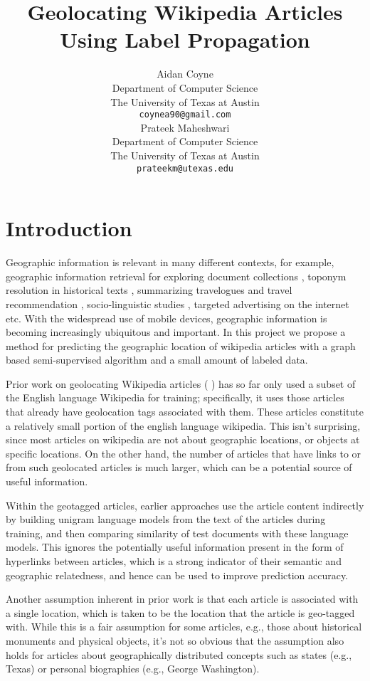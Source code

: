 \documentclass[11pt]{article}
\title{Geolocating Wikipedia Articles Using Label Propagation}
\author{
  Aidan Coyne \\
    Department of Computer Science\\
    The University of Texas at Austin\\
  {\tt coynea90@gmail.com} \\ 
  \And
  Prateek Maheshwari\\
    Department of Computer Science\\
    The University of Texas at Austin\\
  {\tt prateekm@utexas.edu}
}
\date{}
\newcommand{\comment}[1]{}
\begin{document}
\maketitle



\section{Introduction}
\comment{You can now enclose text in a comment block to comment it out inline}
Geographic information is relevant in many different contexts, for example, geographic information retrieval for exploring document collections \cite{}, 
toponym resolution in historical texts \cite{perseus project},  summarizing travelogues and travel recommendation \cite{hao},
socio-linguistic studies \cite{eisenstien}, targeted advertising on the internet etc. With the widespread use of mobile devices, geographic information is becoming increasingly 
ubiquitous and important. In this project we propose a method for predicting the geographic location of wikipedia articles 
with a graph based semi-supervised algorithm and a small amount of labeled data.

Prior work on geolocating Wikipedia articles (\cite{wing-baldridge:11} \cite{rolleretal:12}) has so far only used 
a subset of the English language Wikipedia for training; specifically, it uses those articles that already have geolocation tags associated with them.  
These articles constitute a relatively small portion of the english language wikipedia. \comment{find actual figure}
This isn't surprising, since most articles on wikipedia are not about geographic locations, or objects at specific locations.
On the other hand, the number of articles that have links to or from such geolocated articles is much larger, 
which can be a potential source of useful information. \comment{ find figure  of the wikipedia corpus}

Within the geotagged articles, earlier approaches use the article content indirectly by building unigram language models from the text of the articles during training,
and then comparing similarity of test documents with these language models. This ignores the potentially useful information present in the form of hyperlinks between articles,
which is a strong indicator of their semantic and geographic relatedness, and hence can be used to improve prediction accuracy.

Another assumption inherent in prior work is that each article is associated with a single location, which is taken to be the location that the article is geo-tagged with. 
While this is a fair assumption for some articles, e.g., those about historical monuments and physical objects, it's not so obvious that the assumption also holds for articles about 
geographically distributed concepts such as states (e.g., Texas) or personal biographies (e.g., George Washington). 
\end{document}
